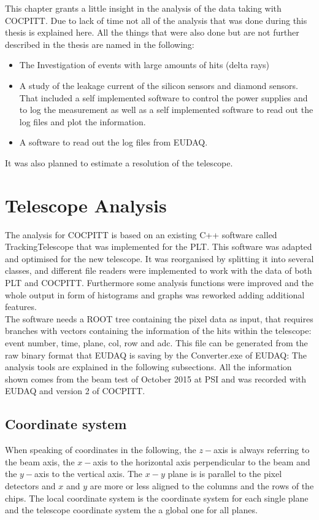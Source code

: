 This chapter grants a little insight in the analysis of the data taking with COCPITT. Due to lack of time not all of the analysis that was done during this thesis is explained here. All the things that were also done but are not further described in the thesis are named in the following:
\begin{itemize}
	\item The Investigation of events with large amounts of hits (delta rays)
	\item A study of the leakage current of the silicon sensors and diamond sensors. That included a self implemented software to control the power supplies and to log the measurement as well as a self implemented software to read out the log files and plot the information.
	\item A software to read out the log files from EUDAQ.
\end{itemize}
It was also planned to estimate a resolution of the telescope.
\section{Telescope Analysis}
The analysis for COCPITT is based on an existing C++ software called TrackingTelescope that was implemented for the \ac{PLT}. This software was adapted and optimised for the new telescope. It was reorganised by splitting it into several classes, and different file readers were implemented to work with the data of both \ac{PLT} and COCPITT. Furthermore some analysis functions were improved and the whole output in form of histograms and graphs was reworked adding additional features.\\
The software needs a ROOT tree containing the pixel data as input, that requires branches with vectors containing the information of the hits within the telescope: event number, time, plane, col, row and adc. This file can be generated from the raw binary format that EUDAQ is saving by the Converter.exe of EUDAQ:
The analysis tools are explained in the following subsections. All the information shown comes from the beam test of October 2015 at \ac{PSI} and was recorded with EUDAQ and version 2 of COCPITT.
\subsection{Coordinate system}
When speaking of coordinates in the following, the $z-$axis is always referring to the beam axis, the $x-$axis to the horizontal axis perpendicular to the beam and the $y-$axis to the vertical axis.  The $x-y$ plane is is parallel to the pixel detectors and $x$ and $y$ are more or less aligned to the columns and the rows of the chips. The local coordinate system is the coordinate system for each single plane and the telescope coordinate system the a global one for all planes.
